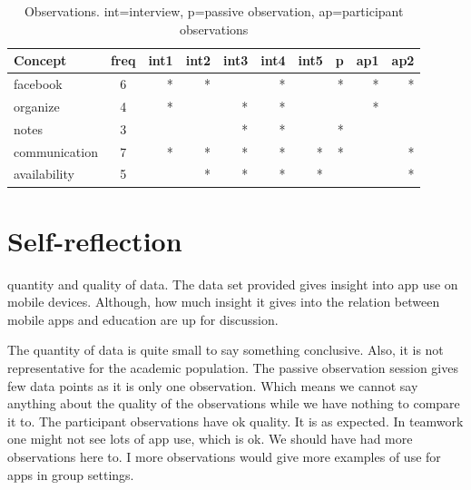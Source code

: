 \documentclass[12pt, a4paper]{article}
\begin{document}
\begin{table}
\centering
\label{tbl:observations}
\caption{Observations. int=interview, p=passive observation, ap=participant observations}
\begin{tabular}{ l c |r |r |r |r |r |r |r |r } 
Concept & freq & int1 & int2 & int3 & int4 & int5 & p & ap1 & ap2 \\
\hline
facebook & 6 & * & * & & * & & * & * & *\\
organize & 4 & * &  & * & * & & & * & \\
notes & 3 & & & * & * & & * & &  \\
communication & 7 & * &  * & * & * & * & * & & * \\
availability & 5 & & * & * & * & * & & & * \\
\end{tabular}
\end{table}

\section{Self-reflection} %

quantity and quality of data. 
The data set provided gives insight into app use on mobile devices. Although,
how much insight it gives into the relation between mobile apps and education
are up for discussion. 

The quantity of data is quite small to say something conclusive. Also, it is
not representative for the academic population. 
The passive observation session gives few data points as it is only
one observation. Which means we cannot say anything about the quality of the
observations while we have nothing to compare it to.
The participant observations have ok quality. It is as expected. In teamwork
one might not see lots of app use, which is ok. We should have had more
observations here to. I more observations would give more examples of use for
apps in group settings. 
\end{document}

